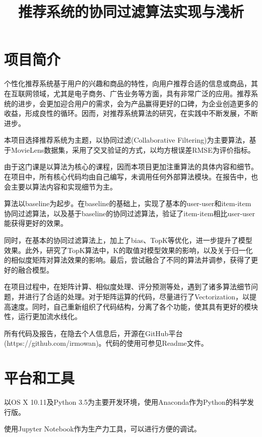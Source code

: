 \documentclass[utf8, a4paper, 11pt, onecolumn]{ctexart}
\title{推荐系统的协同过滤算法实现与浅析}
\begin{document}
\begin{spacing}{1.3}

\maketitle
\tableofcontents
\newpage

\section{项目简介}

个性化推荐系统基于用户的兴趣和商品的特性，向用户推荐合适的信息或商品，其在互联网领域，尤其是电子商务、广告业务等方面，具有非常广泛的应用。推荐系统的进步，会更加迎合用户的需求，会为产品赢得更好的口碑，为企业创造更多的收益，形成良性的循环。因而，对推荐系统算法的研究，在实践中不断发展，不断进步。

本项目选择推荐系统为主题，以协同过滤(Collaborative Filtering)为主要算法，基于MovieLens数据集，采用了交叉验证的方式，以均方根误差RMSE为评价指标。

由于这门课是以算法为核心的课程，因而本项目更加注重算法的具体内容和细节。在项目中，所有核心代码均由自己编写，未调用任何外部算法模块。在报告中，也会主要以算法内容和实现细节为主。

算法以baseline为起步。在baseline的基础上，实现了基本的user-user和item-item协同过滤算法，以及基于baseline的协同过滤算法，验证了item-item相比user-user能获得更好的效果。

同时，在基本的协同过滤算法上，加上了bias、TopK等优化，进一步提升了模型效果。此外，研究了TopK算法中，K的取值对模型效果的影响，以及关于归一化的相似度矩阵对算法效果的影响。最后，尝试融合了不同的算法并调参，获得了更好的融合模型。

在项目过程中，在矩阵计算、相似度处理、评分预测等处，遇到了诸多算法细节问题，并进行了合适的处理。对于矩阵运算的代码，尽量进行了Vectorization，以提高速度。同时，自己重新组织了代码结构，分离了各个功能，使其具有更好的模块性，运行更加流水线化。

所有代码及报告，在隐去个人信息后，开源在GitHub平台(https://github.com/irmowan)。代码的使用可参见Readme文件。

\section{平台和工具}

以OS X 10.11及Python 3.5为主要开发环境，使用Anaconda作为Python的科学发行版。

使用Jupyter Notebook作为生产力工具，可以进行方便的调试。


\end{spacing}
\end{document}
